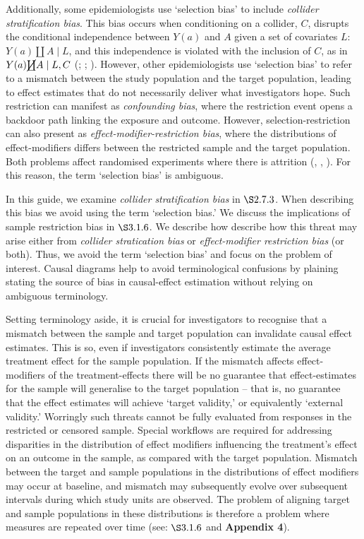 \documentclass[
  singlecolumn]{article}
\begin{document}
Additionally, some epidemiologists use `selection bias' to include
\emph{collider stratification bias}. This bias occurs when conditioning
on a collider, \(C\), disrupts the conditional independence between
\(Y(a)\) and \(A\) given a set of covariates \(L\):
\(Y(a) \coprod A \mid L\), and this independence is violated with the
inclusion of \(C\), as in \(Y(a) \cancel\coprod A \mid L, C\)
(;
;
). However, other
epidemiologists use `selection bias' to refer to a mismatch between the
study population and the target population, leading to effect estimates
that do not necessarily deliver what investigators hope. Such
restriction can manifest as \emph{confounding bias}, where the
restriction event opens a backdoor path linking the exposure and
outcome. However, selection-restriction can also present as
\emph{effect-modifier-restriction bias}, where the distributions of
effect-modifiers differs between the restricted sample and the target
population. Both problems affect randomised experiments where there is
attrition (,
,
). For this reason, the term
`selection bias' is ambiguous.

In this guide, we examine \emph{collider stratification bias} in
\(\S 2.7.3\). When describing this bias we avoid using the term
`selection bias.' We discuss the implications of sample restriction bias
in \(\S 3.1.6\). We describe how describe how this threat may arise
either from \emph{collider stratication bias} or \emph{effect-modifier
restriction bias} (or both). Thus, we avoid the term `selection bias'
and focus on the problem of interest. Causal diagrams help to avoid
terminological confusions by plaining stating the source of bias in
causal-effect estimation without relying on ambiguous terminology.

Setting terminology aside, it is crucial for investigators to recognise
that a mismatch between the sample and target population can invalidate
causal effect estimates. This is so, even if investigators consistently
estimate the average treatment effect for the sample population. If the
mismatch affects effect-modifiers of the treatment-effects there will be
no guarantee that effect-estimates for the sample will generalise to the
target population -- that is, no guarantee that the effect estimates
will achieve `target validity,' or equivalently `external validity.'
Worringly such threats cannot be fully evaluated from responses in the
restricted or censored sample. Special workflows are required for
addressing disparities in the distribution of effect modifiers
influencing the treatment's effect on an outcome in the sample, as
compared with the target population. Mismatch between the target and
sample populations in the distributions of effect modifiers may occur at
baseline, and mismatch may subsequently evolve over subsequent intervals
during which study units are observed. The problem of aligning target
and sample populations in these distributions is therefore a problem
where measures are repeated over time (see: \(\S 3.1.6\) and
\textbf{Appendix 4}).
\end{document}
